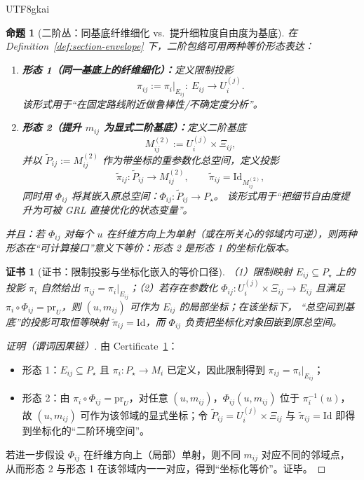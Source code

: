 \documentclass[12pt]{article}
\newtheorem{proposition}{命题}[section]
\newtheorem{certificate}{证书}[section]
\begin{document}
\begin{CJK*}{UTF8}{gkai}
\begin{proposition}[二阶丛：同基底纤维细化 vs.\ 提升细粒度自由度为基底]
\label{prop:second-order-envelope}
在 Definition~\ref{def:section-envelope} 下，二阶包络可用两种等价形态表达：
\begin{enumerate}
  \item \textbf{形态 1（同一基底上的纤维细化）：}定义限制投影
  \[
  \pi_{ij}:=\pi_i|_{E_{ij}}:\ E_{ij}\to U_i^{(j)}.
  \]
  该形式用于“在固定路线附近做鲁棒性/不确定度分析”。
  \item \textbf{形态 2（提升 $m_{ij}$ 为显式二阶基底）：}定义二阶基底
  \[
  M_{ij}^{(2)}:=U_i^{(j)}\times \Xi_{ij},
  \]
  并以 $\tilde P_{ij}:=M_{ij}^{(2)}$ 作为带坐标的重参数化总空间，定义投影
  \[
  \tilde\pi_{ij}:\tilde P_{ij}\to M_{ij}^{(2)},\qquad \tilde\pi_{ij}=\mathrm{Id}_{M_{ij}^{(2)}},
  \]
  同时用 $\Phi_{ij}$ 将其嵌入原总空间：$\Phi_{ij}:\tilde P_{ij}\to P_\star$。
  该形式用于“把细节自由度提升为可被 GRL 直接优化的状态变量”。
\end{enumerate}
并且：若 $\Phi_{ij}$ 对每个 $u$ 在纤维方向上为单射（或在所关心的邻域内可逆），则两种形态在“可计算接口”意义下等价：形态 2 是形态 1 的坐标化版本。
\end{proposition}

\begin{certificate}[证书：限制投影与坐标化嵌入的等价口径]
\label{cert:second-order-envelope}
（1）限制映射 $E_{ij}\subseteq P_\star$ 上的投影 $\pi_i$ 自然给出 $\pi_{ij}=\pi_i|_{E_{ij}}$；（2）若存在参数化 $\Phi_{ij}:U_i^{(j)}
  \times\Xi_{ij}\to E_{ij}$ 且满足 $\pi_i\circ\Phi_{ij}=\mathrm{pr}_{U}$，则 $(u,m_{ij})$ 可作为 $E_{ij}$ 的局部坐标；在该坐标下，
  “总空间到基底”的投影可取恒等映射 $\tilde\pi_{ij}=\mathrm{Id}$，而 $\Phi_{ij}$ 负责把坐标化对象回嵌到原总空间。
\end{certificate}

\begin{proof}[证明（谓词因果链）]
由 Certificate~\ref{cert:second-order-envelope}：
\begin{itemize}
  \item 形态 1：$E_{ij}\subseteq P_\star$ 且 $\pi_i:P_\star\to M_i$ 已定义，因此限制得到 $\pi_{ij}=\pi_i|_{E_{ij}}$；
  \item 形态 2：由 $\pi_i\circ\Phi_{ij}=\mathrm{pr}_{U}$，对任意 $(u,m_{ij})$，$\Phi_{ij}(u,m_{ij})$ 位于 $\pi_i^{-1}(u)$，故 $(u,
    m_{ij})$ 可作为该邻域的显式坐标；令 $\tilde P_{ij}=U_i^{(j)}\times\Xi_{ij}$ 与 $\tilde\pi_{ij}=\mathrm{Id}$ 即得到坐标化的“二阶环境空间”。
\end{itemize}
若进一步假设 $\Phi_{ij}$ 在纤维方向上（局部）单射，则不同 $m_{ij}$ 对应不同的邻域点，从而形态 2 与形态 1 在该邻域内一一对应，得到“坐标化等价”。证毕。
\end{proof}


\end{CJK*}
\end{document}
